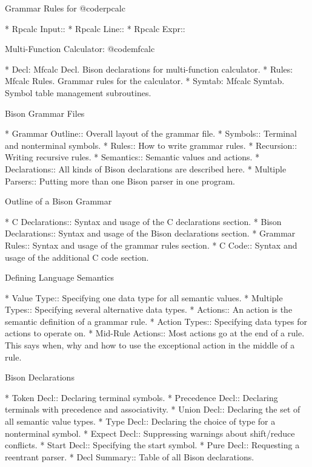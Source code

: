 Grammar Rules for @code{rpcalc}

* Rpcalc Input::      
* Rpcalc Line::       
* Rpcalc Expr::       

Multi-Function Calculator: @code{mfcalc}

* Decl: Mfcalc Decl.      Bison declarations for multi-function calculator.
* Rules: Mfcalc Rules.    Grammar rules for the calculator.
* Symtab: Mfcalc Symtab.  Symbol table management subroutines.

Bison Grammar Files

* Grammar Outline::   Overall layout of the grammar file.
* Symbols::           Terminal and nonterminal symbols.
* Rules::             How to write grammar rules.
* Recursion::         Writing recursive rules.
* Semantics::         Semantic values and actions.
* Declarations::      All kinds of Bison declarations are described here.
* Multiple Parsers::  Putting more than one Bison parser in one program.

Outline of a Bison Grammar

* C Declarations::    Syntax and usage of the C declarations section.
* Bison Declarations::  Syntax and usage of the Bison declarations section.
* Grammar Rules::     Syntax and usage of the grammar rules section.
* C Code::            Syntax and usage of the additional C code section.

Defining Language Semantics

* Value Type::        Specifying one data type for all semantic values.
* Multiple Types::    Specifying several alternative data types.
* Actions::           An action is the semantic definition of a grammar rule.
* Action Types::      Specifying data types for actions to operate on.
* Mid-Rule Actions::  Most actions go at the end of a rule.
                      This says when, why and how to use the exceptional
                        action in the middle of a rule.

Bison Declarations

* Token Decl::        Declaring terminal symbols.
* Precedence Decl::   Declaring terminals with precedence and associativity.
* Union Decl::        Declaring the set of all semantic value types.
* Type Decl::         Declaring the choice of type for a nonterminal symbol.
* Expect Decl::       Suppressing warnings about shift/reduce conflicts.
* Start Decl::        Specifying the start symbol.
* Pure Decl::         Requesting a reentrant parser.
* Decl Summary::      Table of all Bison declarations.

